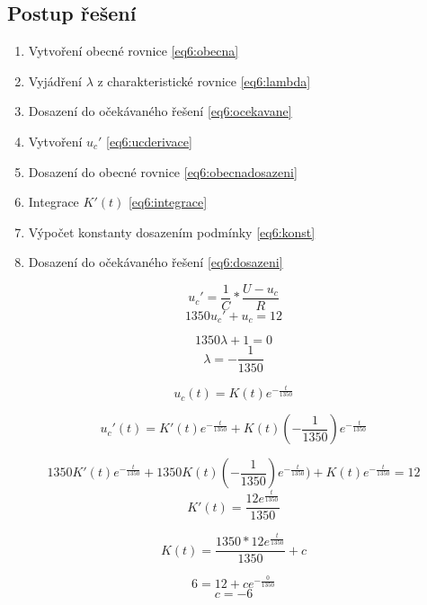 \documentclass[12pt,a4paper,titlepage,final]{article}
\begin{document}
\subsection{Postup řešení}
\begin{enumerate}
\item Vytvoření obecné rovnice \ref{eq6:obecna}
\item Vyjádření $\lambda$ z charakteristické rovnice \ref{eq6:lambda}
\item Dosazení do očekávaného řešení \ref{eq6:ocekavane}
\item Vytvoření $u_c'$ \ref{eq6:ucderivace}
\item Dosazení do obecné rovnice \ref{eq6:obecnadosazeni}
\item Integrace $K'(t)$ \ref{eq6:integrace}
\item Výpočet konstanty dosazením podmínky \ref{eq6:konst}
\item Dosazení do očekávaného řešení \ref{eq6:dosazeni}
\end{enumerate}

\begin{equation}\label{eq6:obecna}
u_c'=\frac{1}{C}*\frac{U-u_c}{R}
\end{equation}
\[1350u_c'+u_c=12\]

\begin{equation}\label{eq6:lambda}
1350\lambda+1=0
\end{equation}
\[\lambda=-\frac{1}{1350}\]

\begin{equation}\label{eq6:ocekavane}
u_c(t)=K(t)e^{-\frac{t}{1350}}
\end{equation}

\begin{equation}\label{eq6:ucderivace}
u_c'(t)=K'(t)e^{-\frac{t}{1350}}+K(t)(-\frac{1}{1350})e^{-\frac{t}{1350}}
\end{equation}

\begin{equation}\label{eq6:obecnadosazeni}
1350K'(t)e^{-\frac{t}{1350}}+1350K(t)(-\frac{1}{1350})e^{-\frac{t}{1350}})+K(t)e^{-\frac{t}{1350}}=12
\end{equation}
\[K'(t)=\frac{12e^{\frac{t}{1350}}}{1350}\]

\begin{equation}\label{eq6:integrace}
K(t) = \frac{1350*12e^{\frac{t}{1350}}}{1350} + c
\end{equation}

\begin{equation}\label{eq6:konst}
6=12+ce^{-\frac{0}{1350}}
\end{equation}
\[c = -6\]
\end{document}
